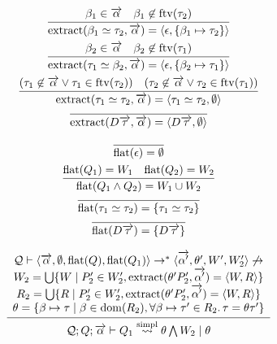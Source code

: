 \begin{gather*}
  \infer{\mathrm{extract}(\beta_1 \simeq \tau_2, \overrightarrow{\alpha}) = \langle \epsilon, \{\beta_1 \mapsto \tau_2\}\rangle}{
    \beta_1 \in \overrightarrow{\alpha}
    &
    \beta_1 \not\in \mathrm{ftv}(\tau_2)
  }
  \\
  \infer{\mathrm{extract}(\tau_1 \simeq \beta_2, \overrightarrow{\alpha}) = \langle \epsilon, \{\beta_2 \mapsto \tau_1\}\rangle}{
    \beta_2 \in \overrightarrow{\alpha}
    &
    \beta_2 \not\in \mathrm{ftv}(\tau_1)
  }
  \\
  \infer{\mathrm{extract}(\tau_1 \simeq \tau_2, \overrightarrow{\alpha}) = \langle \tau_1 \simeq \tau_2, \emptyset\rangle}{
    (\tau_1 \not\in \overrightarrow{\alpha} \lor \tau_1 \in \mathrm{ftv}(\tau_2))
    &
    (\tau_2 \not\in \overrightarrow{\alpha} \lor \tau_2 \in \mathrm{ftv}(\tau_1))
  }
  \\
  \infer{\mathrm{extract}(D \overrightarrow{\tau}, \overrightarrow{\alpha}) = \langle D \overrightarrow{\tau}, \emptyset\rangle}{}
\end{gather*}

\begin{gather*}
  \infer{\mathrm{flat}(\epsilon) = \emptyset}{}
  \\
  \infer{\mathrm{flat}(Q_1 \land Q_2) = W_1 \cup W_2}{
    \mathrm{flat}(Q_1) = W_1
    &
    \mathrm{flat}(Q_2) = W_2
  }
  \\
  \infer{\mathrm{flat}(\tau_1 \simeq \tau_2) = \{\tau_1 \simeq \tau_2\}}{}
  \\
  \infer{\mathrm{flat}(D \overrightarrow{\tau}) = \{D \overrightarrow{\tau}\}}{}
\end{gather*}

\begin{gather*}
  \infer{\mathcal{Q}; Q; \overrightarrow{\alpha} \vdash Q_1 \overset{\mathrm{simpl}}{\elab} \theta \bigwedge W_2 \mid \theta}{
    \begin{array}{c}
      \mathcal{Q} \vdash \langle \overrightarrow{\alpha}, \emptyset, \mathrm{flat}(Q), \mathrm{flat}(Q_1)\rangle \to^* \langle \overrightarrow{\alpha'}, \theta', W', W_2'\rangle \not\to \\
      W_2 = \bigcup \{W \mid P_2' \in W_2', \mathrm{extract}(\theta' P_2', \overrightarrow{\alpha'}) = \langle W, R\rangle\} \\
      R_2 = \bigcup \{R \mid P_2' \in W_2', \mathrm{extract}(\theta' P_2', \overrightarrow{\alpha'}) = \langle W, R\rangle\} \\
      \theta = \{\beta \mapsto \tau \mid \beta \in \dom(R_2), \forall \beta \mapsto \tau' \in R_2\ldotp \tau = \theta \tau'\}
    \end{array}
  }
\end{gather*}

